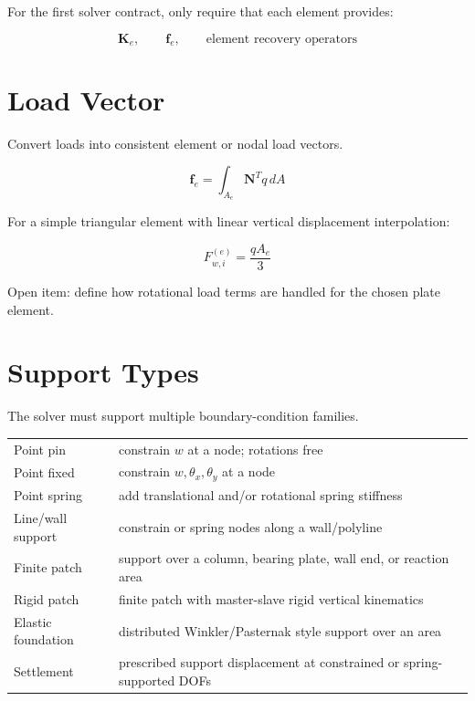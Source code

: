 \documentclass[10pt]{article}
\begin{document}
For the first solver contract, only require that each element provides:

\begin{equation}
\mathbf K_e,\qquad \mathbf f_e,\qquad \text{element recovery operators}
\end{equation}

\section{Load Vector}

Convert loads into consistent element or nodal load vectors.

\begin{equation}
\mathbf f_e = \int_{A_e} \mathbf N^T q\,dA
\end{equation}

For a simple triangular element with linear vertical displacement interpolation:

\begin{equation}
F_{w,i}^{(e)} = \frac{q A_e}{3}
\end{equation}

Open item: define how rotational load terms are handled for the chosen plate
element.

\section{Support Types}

The solver must support multiple boundary-condition families.


{\ttfamily\footnotesize
\begin{tabular}{@{}p{1.8in}p{4.7in}@{}}
Point pin & constrain $w$ at a node; rotations free \\
Point fixed & constrain $w,\theta_x,\theta_y$ at a node \\
Point spring & add translational and/or rotational spring stiffness \\
Line/wall support & constrain or spring nodes along a wall/polyline \\
Finite patch & support over a column, bearing plate, wall end, or reaction area \\
Rigid patch & finite patch with master-slave rigid vertical kinematics \\
Elastic foundation & distributed Winkler/Pasternak style support over an area \\
Settlement & prescribed support displacement at constrained or spring-supported DOFs \\
\end{tabular}
}
\end{document}
